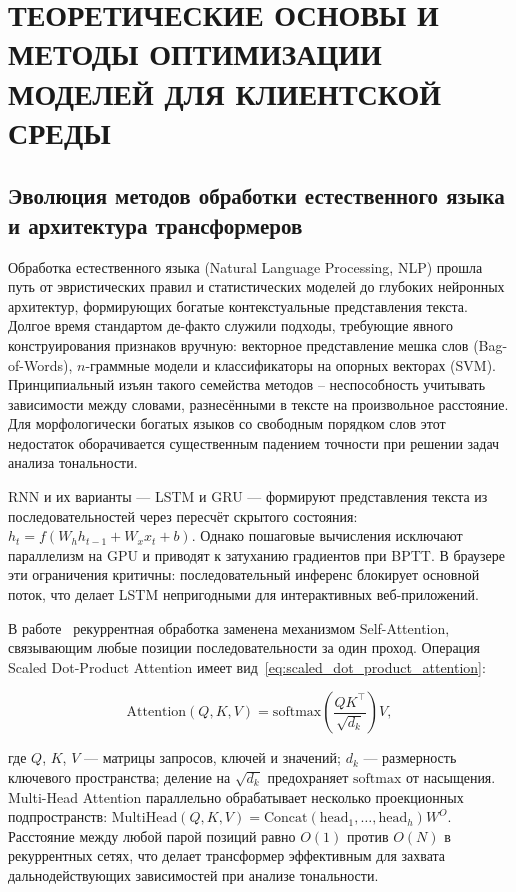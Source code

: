 \chapter{ТЕОРЕТИЧЕСКИЕ ОСНОВЫ И МЕТОДЫ ОПТИМИЗАЦИИ МОДЕЛЕЙ ДЛЯ КЛИЕНТСКОЙ СРЕДЫ}
\label{ch:теоретические_основы_и_методы_оптимизации_моделей_для_клиентской_среды}

\section{Эволюция методов обработки естественного языка и архитектура трансформеров}
\label{sec:эволюция_методов_обработки_естественного_языка_и_архитектура_трансформеров}

Обработка естественного языка (Natural Language Processing, NLP) прошла путь от эвристических правил и статистических моделей до глубоких нейронных архитектур, формирующих богатые контекстуальные представления текста. Долгое время стандартом де-факто служили подходы, требующие явного конструирования признаков вручную: векторное представление мешка слов (Bag-of-Words), $n$-граммные модели и классификаторы на опорных векторах (SVM). Принципиальный изъян такого семейства методов – неспособность учитывать зависимости между словами, разнесёнными в тексте на произвольное расстояние. Для морфологически богатых языков со свободным порядком слов этот недостаток оборачивается существенным падением точности при решении задач анализа тональности.

RNN и их варианты — LSTM и GRU — формируют представления текста из последовательностей через пересчёт скрытого состояния: $h_t = f(W_h h_{t-1} + W_x x_t + b)$. Однако пошаговые вычисления исключают параллелизм на GPU и приводят к затуханию градиентов при BPTT. В браузере эти ограничения критичны: последовательный инференс блокирует основной поток, что делает LSTM непригодными для интерактивных веб-приложений.

В работе~\cite{vaswani2017attention} рекуррентная обработка заменена механизмом Self-Attention, связывающим любые позиции последовательности за один проход. Операция Scaled Dot-Product Attention имеет вид~\eqref{eq:scaled_dot_product_attention}:

\begin{equation}
    \mathrm{Attention}(Q, K, V) = \mathrm{softmax}\!\left(\frac{QK^\top}{\sqrt{d_k}}\right)V,
    \label{eq:scaled_dot_product_attention}
\end{equation}

\noindent где $Q$, $K$, $V$ — матрицы запросов, ключей и значений; $d_k$ — размерность ключевого пространства; деление на $\sqrt{d_k}$ предохраняет $\mathrm{softmax}$ от насыщения. Multi-Head Attention параллельно обрабатывает несколько проекционных подпространств: $\mathrm{MultiHead}(Q,K,V)=\mathrm{Concat}(\mathrm{head}_1,\ldots,\mathrm{head}_h)W^O$. Расстояние между любой парой позиций равно $O(1)$ против $O(N)$ в рекуррентных сетях, что делает трансформер эффективным для захвата дальнодействующих зависимостей при анализе тональности.

